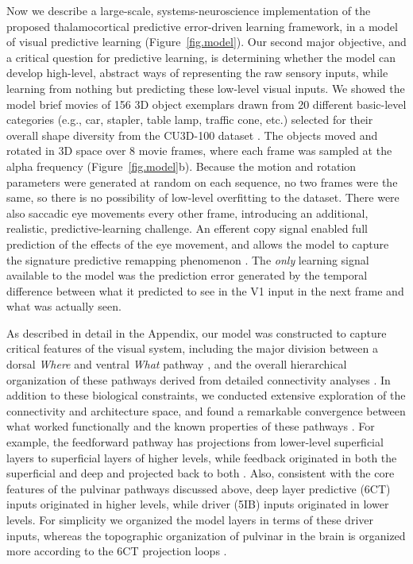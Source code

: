 \documentclass[11pt,twoside]{article}
\newif\myifpdf
\begin{document}
Now we describe a large-scale, systems-neuroscience implementation of the proposed thalamocortical predictive error-driven learning framework, in a model of visual predictive learning (Figure~\ref{fig.model}).  Our second major objective, and a critical question for predictive learning, is determining whether the model can develop high-level, abstract ways of representing the raw sensory inputs, while learning from nothing but predicting these low-level visual inputs.  We showed the model brief movies of 156 3D object exemplars drawn from 20 different basic-level categories (e.g., car, stapler, table lamp, traffic cone, etc.) selected for their overall shape diversity from the CU3D-100 dataset \citep{OReillyWyatteHerdEtAl13}.  The objects moved and rotated in 3D space over 8 movie frames, where each frame was sampled at the alpha frequency (Figure~\ref{fig.model}b).  Because the motion and rotation parameters were generated at random on each sequence, no two frames were the same, so there is no possibility of low-level overfitting to the dataset.  There were also saccadic eye movements every other frame, introducing an additional, realistic, predictive-learning challenge.  An efferent copy signal enabled full prediction of the effects of the eye movement, and allows the model to capture the signature predictive remapping phenomenon \citep{DuhamelColbyGoldberg92,CavanaghHuntAfrazEtAl10,NeupaneGuittonPack17}.  The \emph{only} learning signal available to the model was the prediction error generated by the temporal difference between what it predicted to see in the V1 input in the next frame and what was actually seen.

As described in detail in the Appendix, our model was constructed to capture critical features of the visual system, including the major division between a dorsal \emph{Where} and ventral \emph{What} pathway \citep{UngerleiderMishkin82}, and the overall hierarchical organization of these pathways derived from detailed connectivity analyses \citep{RocklandPandya79,FellemanVanEssen91,MarkovVezoliChameauEtAl14,MarkovErcsey-RavaszGomesEtAl14}.  In addition to these biological constraints, we conducted extensive exploration of the connectivity and architecture space, and found a remarkable convergence between what worked functionally and the known properties of these pathways \citep{OReillyWyatteRohrlich17}.  For example, the feedforward pathway has projections from lower-level superficial layers to superficial layers of higher levels, while feedback originated in both the superficial and deep and projected back to both \citep{RocklandPandya79,FellemanVanEssen91}.  Also, consistent with the core features of the pulvinar pathways discussed above, deep layer predictive (6CT) inputs originated in higher levels, while driver (5IB) inputs originated in lower levels.  For simplicity we organized the model layers in terms of these driver inputs, whereas the topographic organization of pulvinar in the brain is organized more according to the 6CT projection loops \citep{Shipp03}.
\end{document}
